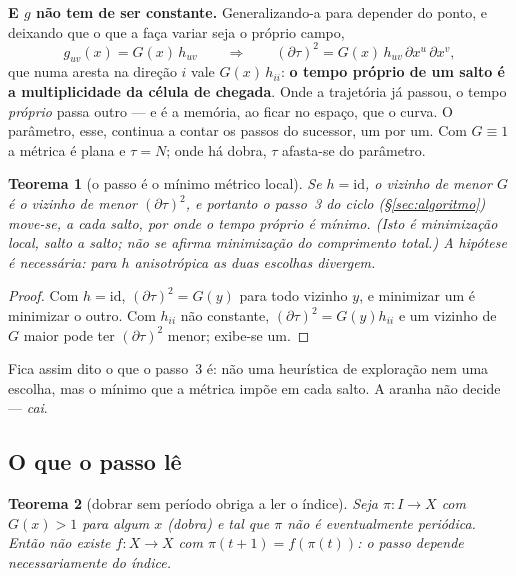 \documentclass[11pt,a4paper]{article}
\newtheorem{teorema}{Teorema}
\begin{document}
\medskip\noindent\textbf{E $g$ não tem de ser constante.} Generalizando-a para
depender do ponto, e deixando que o que a faça variar seja o próprio campo,
\[
g_{uv}(x)=G(x)\,h_{uv}
\qquad\Longrightarrow\qquad
(\partial\tau)^{2}=G(x)\,h_{uv}\,\partial x^{u}\,\partial x^{v} ,
\]
que numa aresta na direção $i$ vale $G(x)\,h_{ii}$: \textbf{o tempo próprio de um
salto é a multiplicidade da célula de chegada}. Onde a trajetória já passou, o
tempo \emph{próprio} passa outro --- e é a memória, ao ficar no espaço, que o
curva. O parâmetro, esse, continua a contar os passos do sucessor, um por um. Com
$G\equiv1$ a métrica é plana e $\tau=N$; onde há dobra, $\tau$ afasta-se do
parâmetro.

\begin{teorema}[o passo é o mínimo métrico local]\label{thm:geodesica}
Se $h=\mathrm{id}$, o vizinho de menor $G$ é o vizinho de menor $(\partial\tau)^{2}$, e
portanto o passo~3 do ciclo (§\ref{sec:algoritmo}) move-se, a cada salto, por
onde o tempo próprio é mínimo. (Isto é minimização \emph{local}, salto a salto;
não se afirma minimização do comprimento total.) A hipótese é necessária: para $h$ anisotrópica as duas escolhas
divergem.
\end{teorema}

\begin{proof}
Com $h=\mathrm{id}$, $(\partial\tau)^{2}=G(y)$ para todo vizinho $y$, e minimizar um é
minimizar o outro. Com $h_{ii}$ não constante, $(\partial\tau)^{2}=G(y)h_{ii}$ e um
vizinho de $G$ maior pode ter $(\partial\tau)^{2}$ menor; exibe-se um.
\end{proof}

\medskip\noindent Fica assim dito o que o passo~3 é: não uma heurística de
exploração nem uma escolha, mas o mínimo que a métrica impõe em cada salto. A
aranha não decide --- \emph{cai}.



\subsection*{O que o passo lê}

\begin{teorema}[dobrar sem período obriga a ler o índice]\label{thm:leitura}
Seja $\pi\colon I\to X$ com $G(x)>1$ para algum $x$ (dobra) e tal que $\pi$
\emph{não} é eventualmente periódica. Então não existe $f\colon X\to X$ com
$\pi(t+1)=f(\pi(t))$: o passo depende necessariamente do índice.
\end{teorema}
\end{document}
